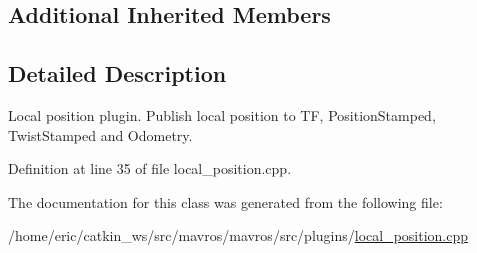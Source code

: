 \subsection*{Additional Inherited Members}


\subsection{Detailed Description}
Local position plugin. Publish local position to TF, Position\+Stamped, Twist\+Stamped and Odometry. 

Definition at line 35 of file local\+\_\+position.\+cpp.



The documentation for this class was generated from the following file\+:\begin{DoxyCompactItemize}
\item 
/home/eric/catkin\+\_\+ws/src/mavros/mavros/src/plugins/\mbox{\hyperlink{local__position_8cpp}{local\+\_\+position.\+cpp}}\end{DoxyCompactItemize}
